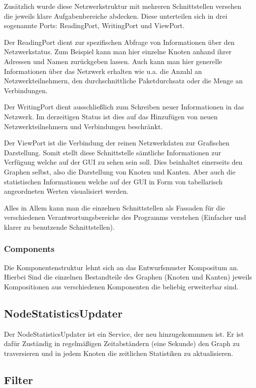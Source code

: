 Zusätzlich wurde diese Netzwerkstruktur mit mehreren Schnittstellen versehen die jeweils klare Aufgabenbereiche abdecken. Diese unterteilen sich in drei sogenannte Ports: ReadingPort, WritingPort und ViewPort.

Der ReadingPort dient zur spezifischen Abfrage von Informationen über den Netzwerkstatus. Zum Beispiel kann man hier einzelne Knoten anhand ihrer Adressen und Namen zurückgeben lassen. Auch kann man hier generelle Informationen über das Netzwerk erhalten wie u.a. die Anzahl an Netzwerkteilnehmern, den durchschnittliche Paketdurchsatz oder die Menge an Verbindungen.

Der WritingPort dient ausschließlich zum Schreiben neuer Informationen in das Netzwerk. Im derzeitigen Status ist dies auf das Hinzufügen von neuen Netzwerkteilnehmern und Verbindungen beschränkt.

Der ViewPort ist die Verbindung der reinen Netzwerkdaten zur Grafischen Darstellung. Somit stellt diese Schnittstelle sämtliche Informationen zur Verfügung welche auf der GUI zu sehen sein soll.
Dies beinhaltet einerseits den Graphen selbst, also die Darstellung von Knoten und Kanten. Aber auch die statistischen Informationen welche auf der GUI in Form von tabellarisch angeordneten Werten visualisiert werden.

Alles in Allem kann man die einzelnen Schnittstellen als Fassaden für die verschiedenen Verantwortungsbereiche des Programms verstehen (Einfacher und klarer zu benutzende Schnittstellen).

\subsubsection{Components}

Die Komponentenstruktur lehnt sich an das Entwurfsmuster Kompositum an. Hierbei Sind die einzelnen Bestandteile des Graphen (Knoten und Kanten) jeweils Kompositionen aus verschiedenen Komponenten die beliebig erweiterbar sind.


\subsection{NodeStatisticsUpdater}

Der NodeStatisticsUpdater ist ein Service, der neu hinzugekommmen ist. Er ist dafür Zuständig in regelmäßigen Zeitabständern (eine Sekunde) den Graph zu traversieren und
in jedem Knoten die zeitlichen Statistiken zu aktualisieren.

\subsection{Filter}

